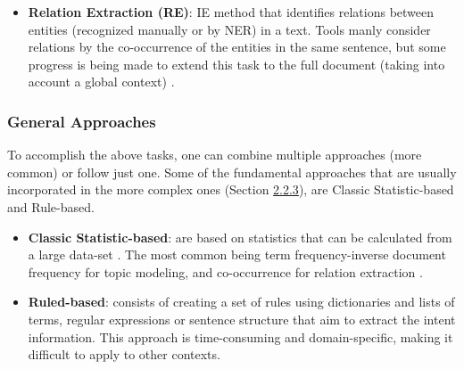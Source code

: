\documentclass[11pt]{article}
\begin{document}
\begin{itemize}
\item{\textbf{Relation Extraction (RE)}: IE method that identifies relations between entities (recognized manually or by NER) in a text. Tools manly consider relations by the co-occurrence of the entities in the same sentence, but some progress is being made to extend this task to the full document (taking into account a global context) \cite{Singhal2016TextMG}.}

\end{itemize}


\hypertarget{6}{\subsubsection{General Approaches}}

To accomplish the above tasks, one can combine multiple approaches (more common) or follow just one. Some of the fundamental approaches that are usually incorporated in the more complex ones (Section \hyperlink{7}{2.2.3}), are Classic Statistic-based and Rule-based.

\begin{itemize}


\item{\textbf{Classic Statistic-based}: are based on statistics that can be calculated from a large data-set \cite{Manning:1999:FSN:311445}. The most common being term frequency-inverse document frequency for topic modeling, and co-occurrence for relation extraction \cite{REVIEW}.}


\item{\textbf{Ruled-based}: consists of creating a set of rules using dictionaries and lists of terms, regular expressions or sentence structure that aim to extract the intent information. This approach is time-consuming and domain-specific, making it difficult to apply to other contexts.}

\end{itemize}
\end{document}

